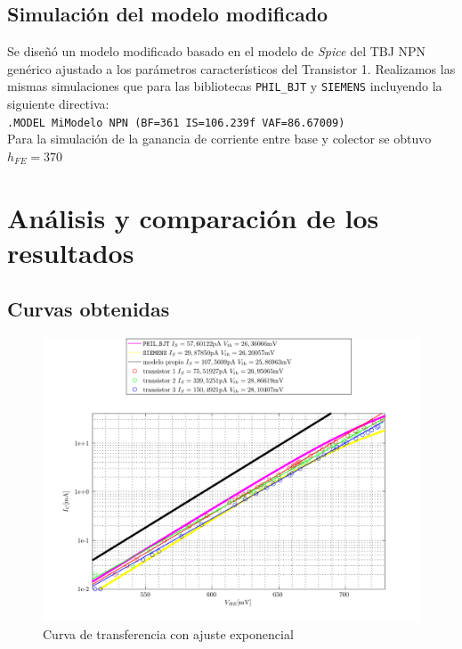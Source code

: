 \documentclass[10pt,spanish,a4paper,openany,notitlepage]{article}
\begin{document}
\subsection{Simulación del modelo modificado}

Se diseñó un modelo modificado basado en el modelo de \emph{Spice} del TBJ NPN genérico ajustado a los parámetros característicos del Transistor 1. Realizamos las mismas simulaciones que para las bibliotecas \texttt{PHIL\_BJT} y \texttt{SIEMENS} incluyendo la siguiente directiva:\\

\texttt{.MODEL MiModelo NPN (BF=361 IS=106.239f VAF=86.67009)}\\

Para la simulación de la ganancia de corriente entre base y colector se obtuvo $h_{FE} = 370$

\section{Análisis y comparación de los resultados}

\subsection{Curvas obtenidas}

\begin{figure}[H] %
\begin{center}
\includegraphics[scale=0.7]{./Octave/IdvsVbe_exp.pdf}
\caption{Curva de transferencia con ajuste exponencial}
 \label{fig:transferencia_exp}
\end{center}
\end{figure}
\end{document}

